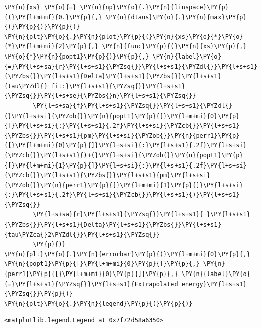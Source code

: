 \begin{tcolorbox}[breakable, size=fbox, boxrule=1pt, pad at break*=1mm,colback=cellbackground, colframe=cellborder]
\begin{Verbatim}[commandchars=\\\{\}]
\PY{n}{xs} \PY{o}{=} \PY{n}{np}\PY{o}{.}\PY{n}{linspace}\PY{p}{(}\PY{l+m+mf}{0.}\PY{p}{,} \PY{n}{dtaus}\PY{o}{.}\PY{n}{max}\PY{p}{(}\PY{p}{)}\PY{p}{)}
\PY{n}{plt}\PY{o}{.}\PY{n}{plot}\PY{p}{(}\PY{n}{xs}\PY{o}{*}\PY{o}{*}\PY{l+m+mi}{2}\PY{p}{,} \PY{n}{func}\PY{p}{(}\PY{n}{xs}\PY{p}{,} \PY{o}{*}\PY{n}{popt1}\PY{p}{)}\PY{p}{,} \PY{n}{label}\PY{o}{=}\PY{l+s+sa}{r}\PY{l+s+s1}{\PYZsq{}}\PY{l+s+s1}{\PYZdl{}}\PY{l+s+s1}{\PYZbs{}}\PY{l+s+s1}{Delta}\PY{l+s+s1}{\PYZbs{}}\PY{l+s+s1}{tau\PYZdl{} fit:}\PY{l+s+s1}{\PYZsq{}}\PY{l+s+s1}{\PYZsq{}}\PY{l+s+se}{\PYZbs{}n}\PY{l+s+s1}{\PYZsq{}}
        \PY{l+s+sa}{f}\PY{l+s+s1}{\PYZsq{}}\PY{l+s+s1}{\PYZdl{}(}\PY{l+s+si}{\PYZob{}}\PY{n}{popt1}\PY{p}{[}\PY{l+m+mi}{0}\PY{p}{]}\PY{l+s+si}{:}\PY{l+s+s1}{.2f}\PY{l+s+si}{\PYZcb{}}\PY{l+s+s1}{\PYZbs{}}\PY{l+s+s1}{pm}\PY{l+s+si}{\PYZob{}}\PY{n}{perr1}\PY{p}{[}\PY{l+m+mi}{0}\PY{p}{]}\PY{l+s+si}{:}\PY{l+s+s1}{.2f}\PY{l+s+si}{\PYZcb{}}\PY{l+s+s1}{)+(}\PY{l+s+si}{\PYZob{}}\PY{n}{popt1}\PY{p}{[}\PY{l+m+mi}{1}\PY{p}{]}\PY{l+s+si}{:}\PY{l+s+s1}{.2f}\PY{l+s+si}{\PYZcb{}}\PY{l+s+s1}{\PYZbs{}}\PY{l+s+s1}{pm}\PY{l+s+si}{\PYZob{}}\PY{n}{perr1}\PY{p}{[}\PY{l+m+mi}{1}\PY{p}{]}\PY{l+s+si}{:}\PY{l+s+s1}{.2f}\PY{l+s+si}{\PYZcb{}}\PY{l+s+s1}{)}\PY{l+s+s1}{\PYZsq{}}
        \PY{l+s+sa}{r}\PY{l+s+s1}{\PYZsq{}}\PY{l+s+s1}{ }\PY{l+s+s1}{\PYZbs{}}\PY{l+s+s1}{Delta}\PY{l+s+s1}{\PYZbs{}}\PY{l+s+s1}{tau\PYZca{}2\PYZdl{}}\PY{l+s+s1}{\PYZsq{}}
        \PY{p}{)}
\PY{n}{plt}\PY{o}{.}\PY{n}{errorbar}\PY{p}{(}\PY{l+m+mi}{0}\PY{p}{,} \PY{n}{popt1}\PY{p}{[}\PY{l+m+mi}{0}\PY{p}{]}\PY{p}{,} \PY{n}{perr1}\PY{p}{[}\PY{l+m+mi}{0}\PY{p}{]}\PY{p}{,} \PY{n}{label}\PY{o}{=}\PY{l+s+s1}{\PYZsq{}}\PY{l+s+s1}{Extrapolated energy}\PY{l+s+s1}{\PYZsq{}}\PY{p}{)}
\PY{n}{plt}\PY{o}{.}\PY{n}{legend}\PY{p}{(}\PY{p}{)}
\end{Verbatim}
\end{tcolorbox}

            \begin{tcolorbox}[breakable, size=fbox, boxrule=.5pt, pad at break*=1mm, opacityfill=0]
\begin{Verbatim}[commandchars=\\\{\}]
<matplotlib.legend.Legend at 0x7f72d58a6350>
\end{Verbatim}
\end{tcolorbox}
        
    \begin{center}
    \end{center}
    { \hspace*{\fill} \\}
    

